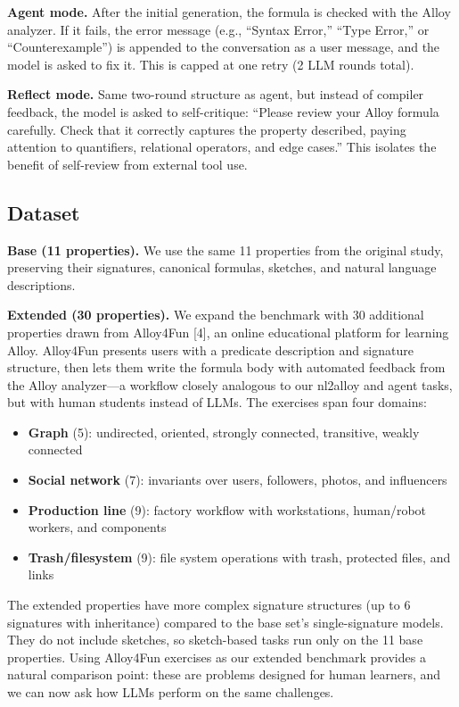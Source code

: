 \documentclass[11pt]{article}
\begin{document}
\textbf{Agent mode.} After the initial generation, the formula is checked with the Alloy analyzer. If it fails, the error message (e.g., ``Syntax Error,'' ``Type Error,'' or ``Counterexample'') is appended to the conversation as a user message, and the model is asked to fix it. This is capped at one retry (2 LLM rounds total).

\textbf{Reflect mode.} Same two-round structure as agent, but instead of compiler feedback, the model is asked to self-critique: ``Please review your Alloy formula carefully. Check that it correctly captures the property described, paying attention to quantifiers, relational operators, and edge cases.'' This isolates the benefit of self-review from external tool use.

\subsection{Dataset}

\textbf{Base (11 properties).} We use the same 11 properties from the original study, preserving their signatures, canonical formulas, sketches, and natural language descriptions.

\textbf{Extended (30 properties).} We expand the benchmark with 30 additional properties drawn from Alloy4Fun [4], an online educational platform for learning Alloy. Alloy4Fun presents users with a predicate description and signature structure, then lets them write the formula body with automated feedback from the Alloy analyzer---a workflow closely analogous to our nl2alloy and agent tasks, but with human students instead of LLMs. The exercises span four domains:
\begin{itemize}
  \item \textbf{Graph} (5): undirected, oriented, strongly connected, transitive, weakly connected
  \item \textbf{Social network} (7): invariants over users, followers, photos, and influencers
  \item \textbf{Production line} (9): factory workflow with workstations, human/robot workers, and components
  \item \textbf{Trash/filesystem} (9): file system operations with trash, protected files, and links
\end{itemize}

The extended properties have more complex signature structures (up to 6 signatures with inheritance) compared to the base set's single-signature models. They do not include sketches, so sketch-based tasks run only on the 11 base properties. Using Alloy4Fun exercises as our extended benchmark provides a natural comparison point: these are problems designed for human learners, and we can now ask how LLMs perform on the same challenges.
\end{document}
